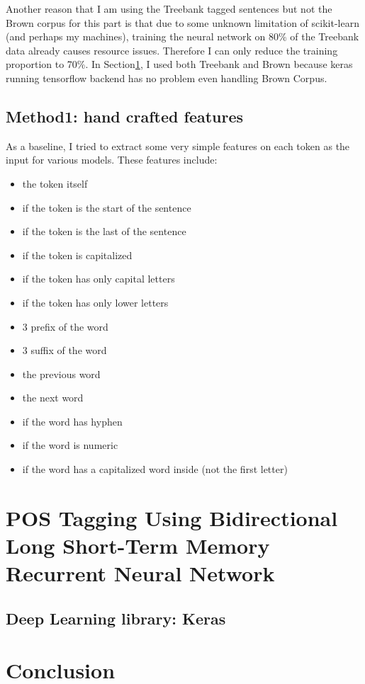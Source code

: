 \documentclass[11pt]{article}
\theoremstyle{plain}
\begin{document}
Another reason that I am using the Treebank tagged sentences but not the 
Brown corpus for this part is that due to some unknown limitation of 
scikit-learn (and perhaps my machines), training the neural network on 80\% 
of the Treebank data already causes resource issues. Therefore I can only 
reduce the training proportion to 70\%. In Section\ref{s:LSTM}, I used both 
Treebank and Brown because keras running tensorflow backend has no 
problem even handling Brown Corpus. 

\subsection{Method1: hand crafted features}
As a baseline, I tried to extract some very simple features on each token as 
the input for various models. These features include:
\begin{itemize}
	\item the token itself
	\item if the token is the start of the sentence
	\item if the token is the last of the sentence
	\item if the token is capitalized
	\item if the token has only capital letters
	\item if the token has only lower letters
	\item 3 prefix of the word
	\item 3 suffix of the word
	\item the previous word
	\item the next word
	\item if the word has hyphen
	\item if the word is numeric
	\item if the word has a capitalized word inside (not the first letter)
\end{itemize}


\section[POS Using BLSTM-RNN in Keras]{POS Tagging Using Bidirectional 
Long Short-Term Memory Recurrent Neural Network }
\label{s:LSTM}

\subsection{Deep Learning library: Keras}
\label{s:keras}

\section{Conclusion}
\label{s:conclusion}


\pagebreak
\appendix


 
\end{document}
